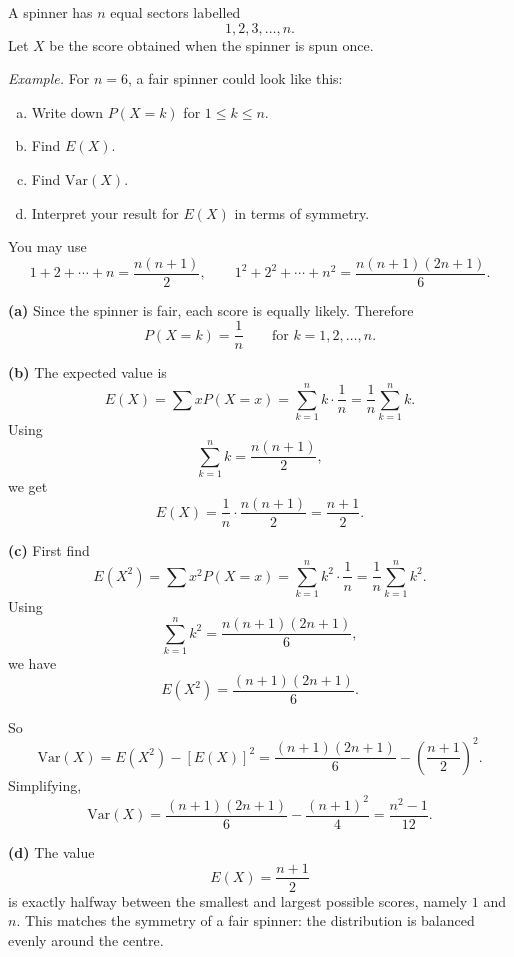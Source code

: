 \begin{problem}
A spinner has $n$ equal sectors labelled
\[
1,2,3,\dots,n.
\]
Let $X$ be the score obtained when the spinner is spun once.

\medskip
\noindent\textit{Example.} For $n=6$, a fair spinner could look like this:

\begin{center}
\end{center}

\begin{enumerate}[(a)]
  \item Write down $P(X=k)$ for $1\le k\le n$.
  \item Find $E(X)$.
  \item Find $\mathrm{Var}(X)$.
  \item Interpret your result for $E(X)$ in terms of symmetry.
\end{enumerate}

You may use
\[
1+2+\cdots+n=\frac{n(n+1)}{2},
\qquad
1^2+2^2+\cdots+n^2=\frac{n(n+1)(2n+1)}{6}.
\]
\end{problem}

\begin{solution}
\textbf{(a)} Since the spinner is fair, each score is equally likely. Therefore
\[
P(X=k)=\frac1n
\qquad \text{for } k=1,2,\dots,n.
\]

\textbf{(b)} The expected value is
\[
E(X)=\sum xP(X=x)
=\sum_{k=1}^n k\cdot \frac1n
=\frac1n\sum_{k=1}^n k.
\]
Using
\[
\sum_{k=1}^n k=\frac{n(n+1)}{2},
\]
we get
\[
E(X)=\frac1n\cdot \frac{n(n+1)}{2}=\frac{n+1}{2}.
\]

\textbf{(c)} First find
\[
E(X^2)=\sum x^2P(X=x)
=\sum_{k=1}^n k^2\cdot \frac1n
=\frac1n\sum_{k=1}^n k^2.
\]
Using
\[
\sum_{k=1}^n k^2=\frac{n(n+1)(2n+1)}{6},
\]
we have
\[
E(X^2)=\frac{(n+1)(2n+1)}{6}.
\]

So
\[
\mathrm{Var}(X)=E(X^2)-[E(X)]^2
=\frac{(n+1)(2n+1)}{6}-\left(\frac{n+1}{2}\right)^2.
\]
Simplifying,
\[
\mathrm{Var}(X)=\frac{(n+1)(2n+1)}{6}-\frac{(n+1)^2}{4}
=\frac{n^2-1}{12}.
\]

\textbf{(d)} The value
\[
E(X)=\frac{n+1}{2}
\]
is exactly halfway between the smallest and largest possible scores, namely $1$ and $n$. This matches the symmetry of a fair spinner: the distribution is balanced evenly around the centre.
\end{solution}

